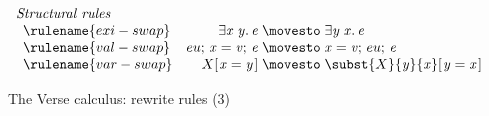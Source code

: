 \documentclass[acmsmall,review,dvipsnames,nocopyrightspace]{acmart}
\newcommand{\Varid}[1]{\mathit{#1}}
\begin{document}
\begin{figure}
  $$
  \begin{array}{l}
    \textit{Structural rules} \\
    \begin{array}{lr@{\;}c@{\;}ll}
    \rulename{exi-swap} & \ensuremath{\exists\Varid{x}\;\Varid{y}.\,\Varid{e}} & \movesto & \ensuremath{\exists\Varid{y}\;\Varid{x}.\,\Varid{e}} \\
    \rulename{val-swap} & \ensuremath{eu;\,\Varid{x}=\Varid{v};\,\Varid{e}} & \movesto & \ensuremath{\Varid{x}=\Varid{v};\,eu;\,\Varid{e}} \\
    \rulename{var-swap} & \ensuremath{X [\mskip1.5mu \Varid{x}=\Varid{y}\mskip1.5mu]} & \movesto & \ensuremath{\subst{X}{\Varid{y}}{\Varid{x}} [\mskip1.5mu \Varid{y}=\Varid{x}\mskip1.5mu]} \\
    \end{array} \\

   \end{array}
   $$
  \caption{The Verse calculus: rewrite rules (3)}
    \label{fig:rules-structural}  \label{fig:structural}
\end{figure}
\end{document}
